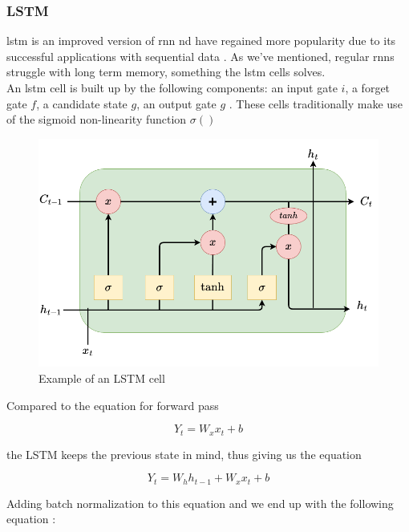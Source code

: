 \subsubsection{LSTM}

\acrfull{lstm} is an improved version of \acrshort{rnn} nd have regained more popularity due to its successful applications with sequential data \cite{karpathy2015visualizing}. As we've mentioned, regular \acrshort{rnn}s struggle with long term memory, something the \acrshort{lstm} cells solves. \\ 


An \acrshort{lstm} cell is built up by the following components: an input gate $i$, a forget gate $f$, a candidate state $g$, an output gate $g$ .
These cells traditionally make use of the sigmoid non-linearity function $\sigma()$

\begin{figure}[h]
    \centering
    \includegraphics{figures/lstmcell.png}
    \caption{Example of an LSTM cell}
    \label{fig:lstmcell}
\end{figure}

Compared to the equation for forward pass 

\begin{equation} \label{eq:cnn}
    Y_t = W_xx_t + b
\end{equation}

the LSTM keeps the previous state in mind, thus giving us the equation


\begin{equation} \label{eq:lstm}
    Y_t = W_hh_{t-1} + W_xx_t + b
\end{equation}

Adding batch normalization to this equation and we end up with the following equation \cite{cooijmans2017recurrent}: 


